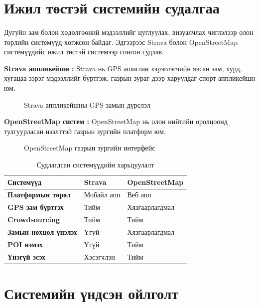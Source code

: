 \section{Ижил төстэй системийн судалгаа}
\paragraph{}
Дугуйн зам болон хөдөлгөөний мэдээллийг цуглуулах, визуалчлах чиглэлээр олон төрлийн системүүд хөгжсөн байдаг. Эдгээрээс Strava болон OpenStreetMap системүүдийг ижил төстэй системээр сонгон судлав.
\par \textbf{Strava аппликейшн :}
Strava нь GPS ашиглан хэрэглэгчийн явсан зам, хурд, хугацаа зэрэг мэдээллийг бүртгэж, газрын зураг дээр харуулдаг спорт аппликейшн юм.
\begin{figure}[H]
    \centering
    \caption{Strava аппликейшны GPS замын дүрслэл}
    \label{fig:strava}
\end{figure}
\par \textbf{OpenStreetMap систем :}
OpenStreetMap нь олон нийтийн оролцоонд тулгуурласан нээлттэй газрын зургийн платформ юм.
\begin{figure}[H]
    \centering
    \caption{OpenStreetMap газрын зургийн интерфейс}
    \label{fig:osm}
\end{figure}
\begin{longtable}{| p{7cm} | p{4cm} | p{4cm} |}
\caption{Судлагдсан системүүдийн харьцуулалт}
\label{tab:compare}\\
\hline
{\bfseries Системүүд } & {\bf Strava} & {\bf OpenStreetMap} \\ \hline
{\bf Платформын төрөл} & Мобайл апп & Веб апп \\ \hline
{\bf GPS зам бүртгэх} & Тийм & Хязгаарлагдмал \\ \hline
{\bf Crowdsourcing} & Тийм & Тийм \\ \hline
{\bf Замын нөхцөл үнэлэх} & Үгүй & Хязгаарлагдмал \\ \hline
{\bf POI нэмэх} & Үгүй & Тийм \\ \hline
{\bf Үнэгүй эсэх} & Хэсэгчлэн & Тийм \\ \hline
\end{longtable}
\section{Системийн үндсэн ойлголт}
